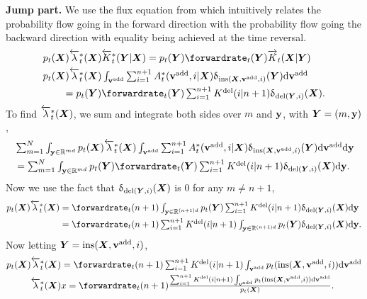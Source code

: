 \textbf{Jump part.}
We use the flux equation from \cite{conforti2022time} which intuitively relates the probability flow going in the forward direction with the probability flow going the backward direction with equality being achieved at the time reversal.
\begin{align}
  &p_t(\mX) \backwardrate_t^*(\mX) \btk_t^*(\mY | \mX) = p_t(\mY) \forwardrate_t(\mY) \ftk_t(\mX | \mY)\\
  &\textstyle p_t(\mX) \backwardrate_t^*(\mX) \int_{\yadd} \sum_{i=1}^{n+1} \autonet_t^*(\yadd, i | \mX) \updelta_{\text{ins}(\mX, \yadd, i)}(\mY) \rmd \yadd \\
  & \qquad = \textstyle p_t(\mY) \forwardrate_t(\mY) \sum_{i=1}^{n+1} \delidxdist(i | n+1) \updelta_{\text{del}(\mY, i)}(\mX) . \label{eq:probflowfull}
\end{align}
To find $\overleftarrow{\lambda}_t^*({\bm{X}})$, we sum and integrate both sides over $m$ and $\mathbf{y}$, with ${\bm{Y}} = (m, \mathbf{y})$,
\begin{align}
    &\textstyle \sum_{m=1}^N \int_{\y \in \mathbb{R}^{md}} p_t(\mX) \backwardrate_t^*(\mX) \int_{\yadd} \sum_{i=1}^{n+1} \autonet_t^*(\yadd, i | \mX) \updelta_{\text{ins}(\mX, \yadd, i)}(\mY) \rmd \yadd \rmd \y \\
    &\textstyle = \sum_{m=1}^N \int_{\y \in \mathbb{R}^{md}} p_t(\mY) \forwardrate_t(\mY) \sum_{i=1}^{n+1} \delidxdist(i | n+1) \updelta_{\text{del}(\mY, i)}(\mX) \rmd \y.
\end{align}
Now we use the fact that $\updelta_{\text{del}({\bm{Y}}, i)}({\bm{X}})$ is $0$ for any $m \neq n+1$,
\begin{align}
    p_t(\mX) \backwardrate_t^*(\mX) &\textstyle = \forwardrate_t(n+1) \int_{\y \in \mathbb{R}^{(n+1)d}} p_t(\mY) \sum_{i=1}^{n+1} \delidxdist(i | n+1) \updelta_{\text{del}(\mY, i)} (\mX) \rmd \y\\
    &\textstyle = \forwardrate_t(n+1) \sum_{i=1}^{n+1} \delidxdist(i | n+1) \int_{\y \in \mathbb{R}^{(n+1)d}} p_t(\mY)  \updelta_{\text{del}(\mY, i)} (\mX) \rmd \y.
\end{align}
Now letting ${\bm{Y}} = \text{ins}({\bm{X}}, {\mathbf{v}}^{\textup{add}}, i)$,
\begin{align}
    p_t(\mX) \backwardrate_t^*(\mX) &\textstyle = \forwardrate_t(n+1) \sum_{i=1}^{n+1} \delidxdist(i | n+1) \int_{\yadd} p_t(\text{ins}(\mX, \yadd, i)) \rmd \yadd\\
    \backwardrate_t^*(\mX) &\textstyle x= \forwardrate_t(n+1) \frac{\sum_{i=1}^{n+1} \delidxdist(i | n+1) \int_{\yadd} p_t(\text{ins}(\mX, \yadd, i)) \rmd \yadd}{p_t(\mX)}.
\end{align}
